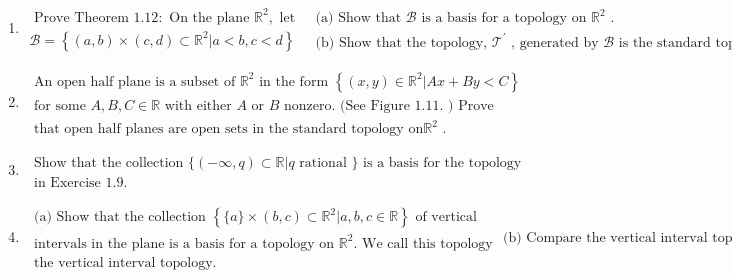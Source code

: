 \documentclass[12pt]{article}
\begin{document}
\begin{enumerate}
	\item[1.16]$ \begin{array} { c } { \text { Prove Theorem } 1.12 : \text { On the plane } \mathbb { R } ^ { 2 } , \text { let } } \\ { \mathcal { B } = \left\{ ( a , b ) \times ( c , d ) \subset \mathbb { R } ^ { 2 } | a < b , c < d \right\} } \end{array} \begin{array} { l } { \text { (a) Show that } \mathcal { B } \text { is a basis for a topology on } \mathbb { R } ^ { 2 } \text { . } } \\ { \text { (b) Show that the topology, } \mathcal { T } ^ { \prime } \text { , generated by } \mathcal { B } \text { is the standard topology on } } \end{array} \mathbb { R } ^ { 2 } \text { (Hint: if } \mathcal { T } \text { is the standard topology, show that } \mathcal { T } \subset \mathcal { T } ^ { \prime } \text { and } \mathcal { T } ^ { \prime } \subset \mathcal { T } . ) $
	
	\item[1.17] $ \begin{array} { l } { \text { An open half plane is a subset of } \mathbb { R } ^ { 2 } \text { in the form } \left\{ ( x , y ) \in \mathbb { R } ^ { 2 } | A x + B y < C \right\} } \\ { \text { for some } A , B , C \in \mathbb { R } \text { with either } A \text { or } B \text { nonzero. (See Figure } 1.11 . \text { ) Prove } } \\ { \text { that open half planes are open sets in the standard topology on} \mathbb { R }^2 \text { . } } \end{array} $
	
	\item[1.18]$ \begin{array} { l } { \text { Show that the collection } \{ ( - \infty , q ) \subset \mathbb { R } | q \text { rational } \} \text { is a basis for the topology } } \\ { \text { in Exercise } 1.9 . } \end{array} $
	
	\item[1.19]$ \begin{array} { l } { \text { (a) Show that the collection } \left\{ \{ a \} \times ( b , c ) \subset \mathbb { R } ^ { 2 } | a , b , c \in \mathbb { R } \right\} \text { of vertical } } \\ { \text { intervals in the plane is a basis for a topology on } \mathbb { R } ^ { 2 } . \text { We call this topology } } \\ { \text { the vertical interval topology. } } \end{array} \text {(b) Compare the vertical interval topology with the standard topology on} \mathbb {R}^2 $
\end{enumerate}
 
\end{document}
